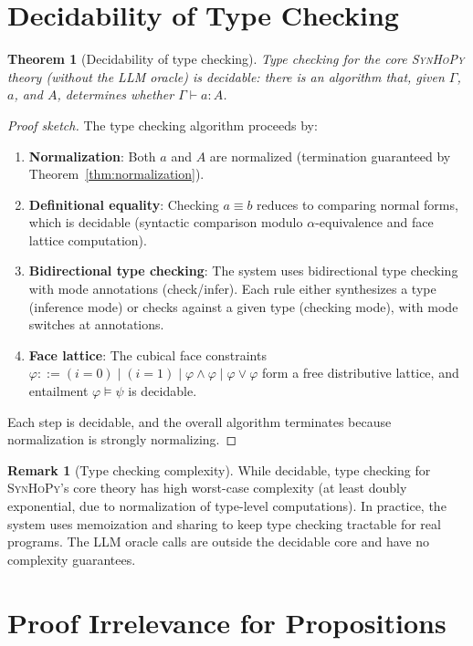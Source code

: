 \documentclass[11pt,a4paper]{report}
\theoremstyle{definition}
\newtheorem{remark}[definition]{Remark}
\theoremstyle{plain}
\newtheorem{theorem}[definition]{Theorem}
\newcommand{\synhopy}{\textsc{SynHoPy}}
\begin{document}
\section{Decidability of Type Checking}

\begin{theorem}[Decidability of type checking]
\label{thm:decidability}
Type checking for the core \synhopy{} theory (without the LLM oracle) is
decidable: there is an algorithm that, given $\Gamma$, $a$, and $A$,
determines whether $\Gamma \vdash a : A$.
\end{theorem}
\begin{proof}[Proof sketch]
The type checking algorithm proceeds by:
\begin{enumerate}
  \item \textbf{Normalization}: Both $a$ and $A$ are normalized (termination
    guaranteed by Theorem~\ref{thm:normalization}).
  \item \textbf{Definitional equality}: Checking $a \equiv b$ reduces to
    comparing normal forms, which is decidable (syntactic comparison modulo
    $\alpha$-equivalence and face lattice computation).
  \item \textbf{Bidirectional type checking}: The system uses bidirectional
    type checking with mode annotations (check/infer).  Each rule either
    synthesizes a type (inference mode) or checks against a given type
    (checking mode), with mode switches at annotations.
  \item \textbf{Face lattice}: The cubical face constraints
    $\varphi ::= (i = 0) \mid (i = 1) \mid \varphi \wedge \varphi \mid \varphi \vee \varphi$
    form a free distributive lattice, and entailment $\varphi \vDash \psi$ is
    decidable.
\end{enumerate}
Each step is decidable, and the overall algorithm terminates because
normalization is strongly normalizing.
\end{proof}

\begin{remark}[Type checking complexity]
While decidable, type checking for \synhopy{}'s core theory has high
worst-case complexity (at least doubly exponential, due to normalization of
type-level computations).  In practice, the system uses memoization and
sharing to keep type checking tractable for real programs.  The LLM oracle
calls are outside the decidable core and have no complexity guarantees.
\end{remark}


\section{Proof Irrelevance for Propositions}
\end{document}
